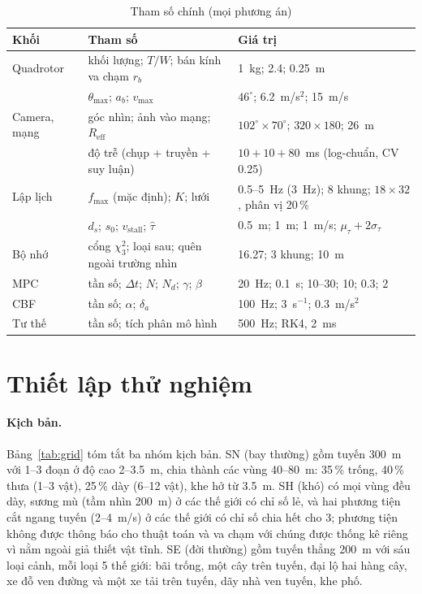 \documentclass[11pt,a4paper]{article}
\theoremstyle{plain}
\theoremstyle{definition}
\theoremstyle{remark}
\newcommand{\fmax}{f_{\max}}
\newcommand{\tauh}{\hat{\tau}}
\newcommand{\Reff}{R_{\mathrm{eff}}}
\begin{document}
\begin{table}[t]
\centering
\caption{Tham số chính (mọi phương án)}\label{tab:params}
\small
\begin{tabular}{@{}lll@{}}
\toprule
Khối & Tham số & Giá trị \\
\midrule
Quadrotor & khối lượng; $T/W$; bán kính va chạm $r_b$ & 1~kg; 2.4; 0.25~m \\
 & $\theta_{\max}$; $a_b$; $v_{\max}$ & $46^\circ$; 6.2~m/s$^2$; 15~m/s \\
Camera, mạng & góc nhìn; ảnh vào mạng; $\Reff$ & $102^\circ\times70^\circ$; $320\times180$; 26~m \\
 & độ trễ (chụp + truyền + suy luận) & $10 + 10 + 80$~ms (log-chuẩn, CV 0.25) \\
Lập lịch & $\fmax$ (mặc định); $K$; lưới & 0.5--5~Hz (3~Hz); 8 khung; $18\times32$, phân vị 20\,\% \\
 & $d_s$; $s_0$; $v_{\mathrm{stall}}$; $\tauh$ & 0.5~m; 1~m; 1~m/s; $\mu_\tau + 2\sigma_\tau$ \\
Bộ nhớ & cổng $\chi^2_3$; loại sau; quên ngoài trường nhìn & 16.27; 3 khung; 10~m \\
MPC & tần số; $\Delta t$; $N$; $N_d$; $\gamma$; $\beta$ & 20~Hz; 0.1~s; 10--30; 10; 0.3; 2 \\
CBF & tần số; $\alpha$; $\delta_a$ & 100~Hz; 3~s$^{-1}$; 0.3~m/s$^2$ \\
Tư thế & tần số; tích phân mô hình & 500~Hz; RK4, 2~ms \\
\bottomrule
\end{tabular}
\end{table}

\section{Thiết lập thử nghiệm}\label{sec:setup}

\paragraph{Kịch bản.} Bảng~\ref{tab:grid} tóm tắt ba nhóm kịch bản. SN (bay thường) gồm tuyến 300~m với 1--3 đoạn ở độ cao 2--3.5~m, chia thành các vùng 40--80~m: 35\,\% trống, 40\,\% thưa (1--3 vật), 25\,\% dày (6--12 vật), khe hở từ 3.5~m. SH (khó) có mọi vùng đều dày, sương mù (tầm nhìn 200~m) ở các thế giới có chỉ số lẻ, và hai phương tiện cắt ngang tuyến (2--4~m/s) ở các thế giới có chỉ số chia hết cho 3; phương tiện không được thông báo cho thuật toán và va chạm với chúng được thống kê riêng vì nằm ngoài giả thiết vật tĩnh. SE (đời thường) gồm tuyến thẳng 200~m với sáu loại cảnh, mỗi loại 5 thế giới: bãi trống, một cây trên tuyến, đại lộ hai hàng cây, xe đỗ ven đường và một xe tải trên tuyến, dãy nhà ven tuyến, khe phố.
\end{document}
